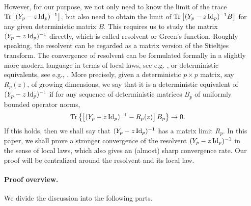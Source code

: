 However, for our purpose, we not only need to know the limit of the trace $\operatorname{Tr}\left[ (Y_p-z\operatorname{Id}_p)^{-1}\right]$, but also need to obtain the limit of $\operatorname{Tr}\left[ (Y_p-z\operatorname{Id}_p)^{-1}B\right]$ for any given deterministic matrix $B$. This  requires us to study the matrix $(Y_p-z\operatorname{Id}_p)^{-1}$ directly, which is called resolvent or Green's function. Roughly speaking, the resolvent can be regarded as a matrix version of the Stieltjes transform. The convergence of resolvent can be formulated formally in a slightly more modern language in terms of local laws, see e.g. \cite{isotropic,erdos2017dynamical,Anisotropic}, or deterministic equivalents, see e.g., \cite{Hachem2007deterministic,DS18}. More precisely, given a deterministic $p\times p$ matrix, say $R_p(z)$, of growing dimensions, we say that it is a deterministic equivalent of $(Y_p-z\operatorname{Id}_p)^{-1}$ if for any sequence of deterministic matrices $B_p$ of uniformly bounded operator norms,
$$\operatorname{Tr} \left\{\left[ (Y_p-z\operatorname{Id}_p)^{-1}-R_p(z)\right]B_p\right\}\to 0.$$
If this holds, then we shall say that $(Y_p-z\operatorname{Id}_p)^{-1}$ has a matrix limit $R_p$. In this paper, we shall prove a stronger convergence of the resolvent $(Y_p-z\operatorname{Id}_p)^{-1}$ in the sense of local laws, which also gives an (almost) sharp convergence rate. Our proof will be centralized around the resolvent and its local law.


\paragraph{Proof overview.} We divide the discussion into the following parts.

